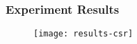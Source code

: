 \begin{frame}
  \frametitle{Experiment Results}
  \begin{figure}
    \centering
    \texttt{[image: results-csr]}
  \end{figure}
\end{frame}
